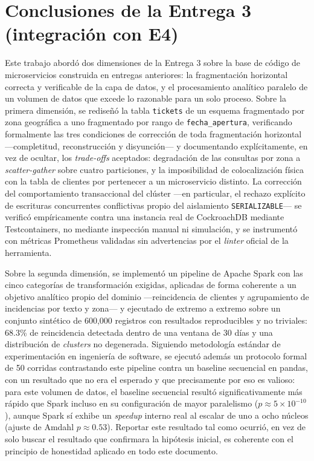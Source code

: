 \section{Conclusiones de la Entrega 3 (integración con E4)}
\label{sec:conclusiones}

Este trabajo abordó dos dimensiones de la Entrega 3 sobre la base de código de microservicios
construida en entregas anteriores: la fragmentación horizontal correcta y verificable de la capa
de datos, y el procesamiento analítico paralelo de un volumen de datos que excede lo razonable
para un solo proceso. Sobre la primera dimensión, se rediseñó la tabla \texttt{tickets} de un
esquema fragmentado por zona geográfica a uno fragmentado por rango de \texttt{fecha\_apertura},
verificando formalmente las tres condiciones de corrección de toda fragmentación horizontal
—completitud, reconstrucción y disyunción— y documentando explícitamente, en vez de ocultar, los
\emph{trade-offs} aceptados: degradación de las consultas por zona a \emph{scatter-gather} sobre
cuatro particiones, y la imposibilidad de colocalización física con la tabla de clientes por
pertenecer a un microservicio distinto. La corrección del comportamiento transaccional del clúster
—en particular, el rechazo explícito de escrituras concurrentes conflictivas propio del aislamiento
\texttt{SERIALIZABLE}— se verificó empíricamente contra una instancia real de CockroachDB mediante
Testcontainers, no mediante inspección manual ni simulación, y se instrumentó con métricas
Prometheus validadas sin advertencias por el \emph{linter} oficial de la herramienta.

Sobre la segunda dimensión, se implementó un pipeline de Apache Spark con las cinco categorías de
transformación exigidas, aplicadas de forma coherente a un objetivo analítico propio del dominio
—reincidencia de clientes y agrupamiento de incidencias por texto y zona— y ejecutado de extremo a
extremo sobre un conjunto sintético de 600{,}000 registros con resultados reproducibles y no
triviales: 68.3\% de reincidencia detectada dentro de una ventana de 30 días y una distribución de
\emph{clusters} no degenerada. Siguiendo metodología estándar de experimentación en ingeniería de
software, se ejecutó además un protocolo formal de 50 corridas contrastando este pipeline contra un
baseline secuencial en pandas, con un resultado que no era el esperado y que precisamente por eso
es valioso: para este volumen de datos, el baseline secuencial resultó significativamente más
rápido que Spark incluso en su configuración de mayor paralelismo
($p \approx 5\times10^{-10}$), aunque Spark sí exhibe un \emph{speedup} interno real al escalar de
uno a ocho núcleos (ajuste de Amdahl $p \approx 0.53$). Reportar este resultado tal como ocurrió,
en vez de solo buscar el resultado que confirmara la hipótesis inicial, es coherente con el
principio de honestidad aplicado en todo este documento.

